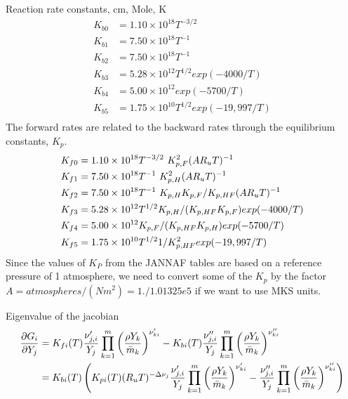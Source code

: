 \documentclass{article}
\begin{document}
Reaction rate constants, cm, Mole, K
\begin{align*}
   K_{b0} &=  1.10 \times 10^{18} T^{-3/2} \\
   K_{b1} &=  7.50 \times 10^{18} T^{-1} \\
   K_{b2} &=  7.50 \times 10^{18} T^{-1} \\
   K_{b3} &=  5.28 \times 10^{12} T^{1/2} exp(-4000/T) \\
   K_{b4} &=  5.00 \times 10^{12} exp(-5700/T) \\
   K_{b5} &=  1.75 \times 10^{10} T^{1/2} exp(-19,997/T)\\
\end{align*}   
The forward rates are related to the backward rates through the equilibrium constants, $K_p$.
\begin{align*}
   K_{f0} &=  1.10 \times 10^{18} T^{-3/2} ~K_{p,F}^2 (A R_u T)^{-1} \\
   K_{f1} &=  7.50 \times 10^{18} T^{-1}~K_{p,H}^2 (A R_u T)^{-1}  \\
   K_{f2} &=  7.50 \times 10^{18} T^{-1}~K_{p,H} K_{p,F}/K_{p,HF} (A R_u T)^{-1}  \\
   K_{f3} &=  5.28 \times 10^{12} T^{1/2} K_{p,H}/(K_{p,HF} K_{p,F})exp(-4000/T)  \\
   K_{f4} &=  5.00 \times 10^{12} K_{p,F}/(K_{p,HF} K_{p,H}) exp(-5700/T)  \\
   K_{f5} &=  1.75 \times 10^{10} T^{1/2} 1/K_{p,HF}^2 exp(-19,997/T)
\end{align*}   
Since the values of $K_P$ from the JANNAF tables are based on a reference pressure of
1 atmosphere, we need to convert some of the $K_p$ by the factor $A= atmospheres/(N m^2)=1./1.01325e5$ if
we want to use MKS units.

Eigenvalue of the jacobian
\begin{align*}
    {\partial G_i \over \partial Y_j} &= 
            K_{fi}(T) {\nu_{j,i}' \over Y_j}  \prod_{k=1}^{m} \left({\rho Y_k \over \bar{m}_k} \right)^{\nu_{ki}'}
         -  K_{bi}(T){\nu_{j,i}''\over Y_j}  \prod_{k=1}^{m}  \left({\rho Y_k \over \bar{m}_k} \right)^{\nu_{ki}''} \\
    &=  K_{bi}(T) \left(
            K_{pi}(T)(R_u T)^{-\Delta \nu_j}
                     {\nu_{j,i}' \over Y_j}  \prod_{k=1}^{m} \left({\rho Y_k \over \bar{m}_k} \right)^{\nu_{ki}'}
         -           {\nu_{j,i}''\over Y_j}  \prod_{k=1}^{m}  \left({\rho Y_k \over \bar{m}_k} \right)^{\nu_{ki}''}
                  \right) \\
\end{align*}
\end{document}
